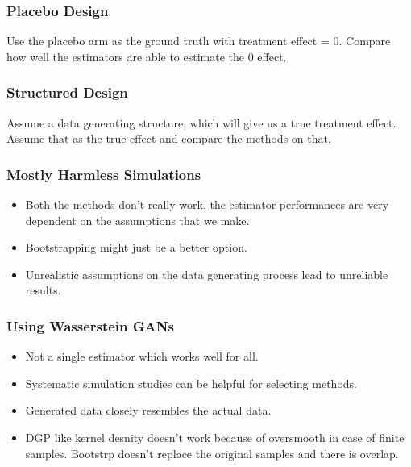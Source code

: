 \documentclass{beamer}
\begin{document}
\begin{frame}
	\frametitle{Placebo Design}
	Use the placebo arm as the ground truth with treatment effect = $ 0 $. Compare how well
	the estimators are able to estimate the $ 0 $ effect.
\end{frame}

\begin{frame}
	\frametitle{Structured Design}
	Assume a data generating structure, which will give us a true treatment effect. Assume
	that as the true effect and compare the methods on that.
\end{frame}

\begin{frame}
	\frametitle{Mostly Harmless Simulations}
	\begin{itemize}
		\item Both the methods don't really work, the estimator performances are very
			dependent on the assumptions that we make.
		\item Bootstrapping might just be a better option.
		\item Unrealistic assumptions on the data generating process lead to unreliable results.
	\end{itemize}
\end{frame}

\begin{frame}
	\frametitle{Using Wasserstein GANs}
	\begin{itemize}
		\item Not a single estimator which works well for all.
		\item Systematic simulation studies can be helpful for selecting methods.
		\item Generated data closely resembles the actual data.
		\item DGP like kernel desnity doesn't work because of oversmooth in case of finite samples. Bootstrp doesn't replace the original samples and there is overlap.
	\end{itemize}
\end{frame}
\end{document}
